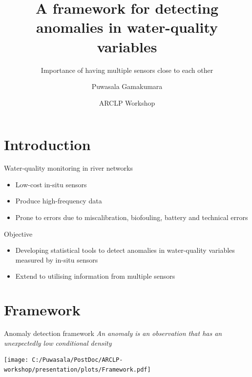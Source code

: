 \documentclass[14pt,ignorenonframetext,compress]{beamer}
\title[]{A framework for detecting anomalies in water-quality
variables}
\subtitle{Importance of having multiple sensors close to each other}
\author[
        Puwasala Gamakumara
    ]{Puwasala Gamakumara}
\date[
      ARCLP Workshop
  ]{
      ARCLP Workshop
        }
\providecommand{\tightlist}{%
  \setlength{\itemsep}{0pt}\setlength{\parskip}{0pt}}
\begin{document}
  \begin{frame}[plain]
  \titlepage
  \end{frame}



\hypertarget{introduction}{%
\section{Introduction}\label{introduction}}

\begin{frame}{Water-quality monitoring in river networks}
\protect\hypertarget{water-quality-monitoring-in-river-networks}{}
\begin{itemize}
\item
  Low-cost in-situ sensors
\item
  Produce high-frequency data
\item
  Prone to errors due to miscalibration, biofouling, battery and
  technical errors
\end{itemize}

\begin{block}{Objective}
\protect\hypertarget{objective}{}
\begin{itemize}
\tightlist
\item
  Developing statistical tools to detect anomalies in water-quality
  variables measured by in-situ sensors
\item
  Extend to utilising information from multiple sensors
\end{itemize}
\end{block}
\end{frame}

\hypertarget{framework}{%
\section{Framework}\label{framework}}

\begin{frame}{Anomaly detection framework}
\protect\hypertarget{anomaly-detection-framework}{}
\emph{An anomaly is an observation that has an unexpectedly low
conditional density}

\texttt{[image: C:/Puwasala/PostDoc/ARCLP-workshop/presentation/plots/Framework.pdf]}
\end{frame}
\end{document}
